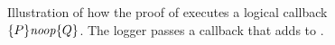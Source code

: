 \begin{figure}
  
  \caption{Illustration of how the proof of  executes a logical
callback $\{P\}\mathit{noop}\{Q\}$. The logger passes a callback that adds  to .}
  \label{fig:circ-callback}
\end{figure}


